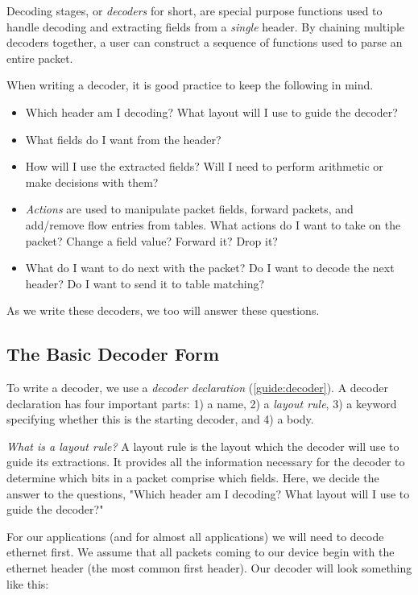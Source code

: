 Decoding stages, or \textit{decoders} for short, are special purpose functions
used to handle decoding and extracting fields from a \textit{single} header. By
chaining multiple decoders together, a user can construct a sequence of
functions used to parse an entire packet.

When writing a decoder, it is good practice to keep the following in mind.

\begin{itemize}
\item Which header am I decoding? What layout will I use to guide the decoder?

\item What fields do I want from the header?

\item How will I use the extracted fields? Will I need to perform arithmetic or
make decisions with them?

\item \textit{Actions} are used to manipulate packet fields, forward packets,
and add/remove flow entries from tables. What actions do I want to take on the
packet? Change a field value? Forward it? Drop it?

\item What do I want to do next with the packet? Do I want to decode the next
header? Do I want to send it to table matching?
\end{itemize}

As we write these decoders, we too will answer these questions.

\subsection{The Basic Decoder Form} \label{tut:basic_decoder}

To write a decoder, we use a \textit{decoder declaration} (\ref{guide:decoder}).
A decoder declaration has four important parts: 1) a name, 2) a \textit{layout
rule}, 3) a keyword specifying whether this is the starting decoder, and 4) a
body.

\textit{What is a layout rule?} A layout rule is the layout which the decoder
will use to guide its extractions. It provides all the information necessary for
the decoder to determine which bits in a packet comprise which fields. Here, we
decide the answer to the questions, "Which header am I decoding? What layout
will I use to guide the decoder?"

For our applications (and for almost all applications) we will need to decode
ethernet first. We assume that all packets coming to our device begin with the
ethernet header (the most common first header). Our decoder will look something
like this:

